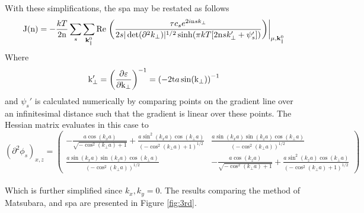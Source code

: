 \documentclass[a4paper, 12pt]{article}
\begin{document}
	With these simplifications, the \gls{spa} may be restated as follows
\begin{equation}\label{SPA_2}
	{\rm J(n)} = -\frac{kT}{2{\rm n}}\sum_s \sum_{{\bf k}_\parallel^0}{\rm Re}\left.\left(\frac{\tau c_se^{2i{\rm n}sk_\perp}}{2s\vert \det(\partial^2k_\perp)\vert^{1/2}\sinh(\pi kT[2{\rm n}sk_\perp '+\psi_s '])} \right) \right\vert_{\mu , {\bf k}_\parallel^0}
\end{equation}
Where
\begin{equation}
	\rm k_\perp' = \left(\frac{\partial\varepsilon}{\partial k_\perp}\right)^{-1}=\left(-2t\mathnormal a\sin(k_\perp)\right)^{-1}
\end{equation}
and $\psi_s'$ is calculated numerically by comparing points on the gradient line over an infinitesimal distance such that the gradient is linear over these points.
The Hessian matrix evaluates in this case to
\\[3mm]
\begin{equation}
	(\partial^2\phi_s)_{x, z}=\begin{pmatrix} -\frac{a\cos(k_x a)}{\sqrt{-\cos^2(k_\perp a)+1}}+\frac{a\sin^2(k_x a)\cos(k_\perp a)}{(-\cos^2(k_\perp a)+1)^{1/2}}&\frac{a\sin(k_x a)\sin(k_z a)\cos(k_\perp a)}{(-\cos^2(k_\perp a))^{1/2}}\\\frac{a\sin(k_x a)\sin(k_z a)\cos(k_\perp a)}{(-\cos^2(k_\perp a))^{1/2}}&-\frac{a\cos(k_z a)}{\sqrt{-\cos^2(k_\perp a)+1}}+\frac{a\sin^2(k_z a)\cos(k_\perp a)}{(-\cos^2(k_\perp a)+1)^{1/2}} \end{pmatrix}
\end{equation}
\normalsize
\\[5mm]
Which is further simplified since $k_x, k_y = 0$. The results comparing the method of Matsubara, and \gls{spa} are presented in Figure \ref{fig:3rd}.
\\ [5mm]
\end{document}
